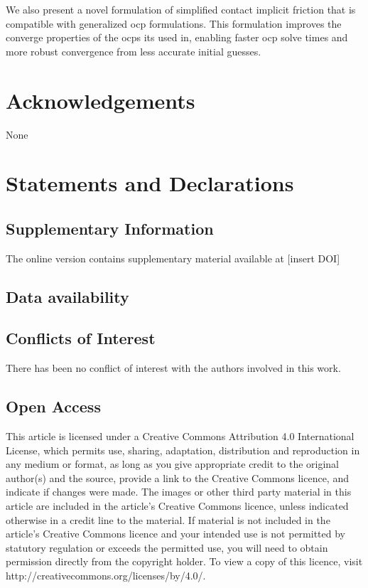 \documentclass[default,iicol]{sn-jnl}
\begin{document}
We also present a novel formulation of simplified contact implicit friction that is compatible with generalized \gls{ocp} formulations. This formulation improves the converge properties of the \glspl{ocp} its used in, enabling faster \gls{ocp} solve times and more robust convergence from less accurate initial guesses.

\section{Acknowledgements}
None

\section{Statements and Declarations}

\subsection{Supplementary Information} The online version contains supplementary material available at [insert DOI]

\subsection{Data availability} 

\subsection{Conflicts of Interest} There has been no conflict of interest with the
authors involved in this work.

\subsection{Open Access} This article is licensed under a Creative Commons Attribution 4.0 International License, which permits use, sharing, adaptation, distribution and reproduction in any medium or format, as long
as you give appropriate credit to the original author(s) and the source,
provide a link to the Creative Commons licence, and indicate if changes
were made. The images or other third party material in this article are
included in the article's Creative Commons licence, unless indicated
otherwise in a credit line to the material. If material is not included in
the article's Creative Commons licence and your intended use is not
permitted by statutory regulation or exceeds the permitted use, you will
need to obtain permission directly from the copyright holder. To view a
copy of this licence, visit http://creativecommons.org/licenses/by/4.0/.



\end{document}
